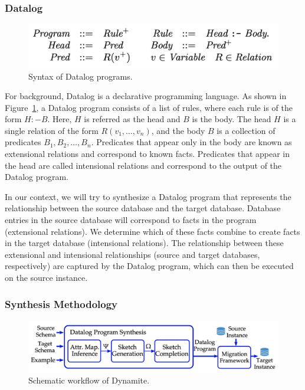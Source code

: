 \documentclass[]{article}
\begin{document}
            \subsubsection{Datalog}

                \begin{figure}[]
                    \centering
                    \includegraphics[width=.7\textwidth]{datalog_syntax}
                    \caption{Syntax of Datalog programs.}
                    \label{fig:datalog_syntax}
                \end{figure}

                For background, Datalog is a declarative programming language. As shown in Figure~\ref{fig:datalog_syntax}, a Datalog program consists of a list of rules, where each rule is of the form $H :- B$. Here, $H$ is referred as the head and $B$ is the body. The head $H$ is a single relation of the form $R(v_1, \ldots, v_n)$, and the body $B$ is a collection of predicates $B_1, B_2, \ldots, B_n$. Predicates that appear only in the body are known as extensional relations and correspond to known facts. Predicates that appear in the head are called intensional relations and correspond to the output of the Datalog program. 

                In our context, we will try to synthesize a Datalog program that represents the relationship between the source database and the target database. Database entries in the source database will correspond to facts in the program (extensional relations). We determine which of these facts combine to create facts in the target database (intensional relations). The relationship between these extensional and intensional relationships (source and target databases, respectively) are captured by the Datalog program, which can then be executed on the source instance. 

            \subsubsection{Synthesis Methodology}

                \begin{figure}[]
                    \centering
                    \includegraphics[width=.7\textwidth]{dynamite_workflow}
                    \caption{Schematic workflow of Dynamite.}
                    \label{fig:dynamite_workflow}
                \end{figure}
\end{document}
